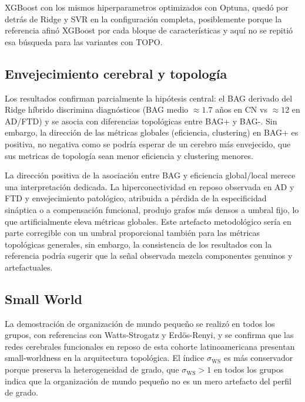 \documentclass[12pt,a4paper]{article}
\begin{document}
XGBoost con los mismos hiperparametros optimizados con Optuna, quedó por detrás de Ridge y SVR en la configuración completa, posiblemente porque la referencia\cite{bazan2026} afinó XGBoost por cada bloque de características y aquí no se repitió esa búsqueda para las variantes con TOPO.

\subsection{Envejecimiento cerebral y topología}

Los resultados confirman parcialmente la hipótesis central: el BAG derivado del Ridge híbrido discrimina diagnósticos (BAG medio $\approx 1.7$ años en CN vs $\approx 12$ en AD/FTD\cite{moguilner2024}) y se asocia con diferencias topológicas entre BAG+ y BAG-. Sin embargo, la dirección de las métricas globales (eficiencia, clustering) en BAG+ es positiva, no negativa como se podría esperar de un cerebro más envejecido, que sus metricas de topología sean menor eficiencia y clustering menores.

La dirección positiva de la asociación entre BAG y eficiencia global/local merece una interpretación dedicada. La hiperconectividad en reposo observada en AD y FTD y envejecimiento patológico\cite{coronel2025}, atribuida a pérdida de la especificidad sináptica o a compensación funcional, produjo grafos más densos a umbral fijo, lo que artificialmente eleva métricas globales. Este artefacto metodológico sería en parte corregible con un umbral proporcional también para las métricas topológicas generales, sin
embargo, la consistencia de los resultados con la referencia podría sugerir que la señal observada mezcla componentes genuinos y artefactuales.


\subsection{Small World}

La demostración de organización de mundo pequeño\cite{watts1998} se realizó en todos los grupos, con referencias con Watts-Strogatz y Erdös-Renyi, y se confirma que las redes cerebrales funcionales en reposo de esta cohorte latinoamericana presentan small-worldness en la arquitectura topológica. El índice $\sigma_{\text{WS}}$ es más conservador porque preserva la heterogeneidad de grado, que $\sigma_{\text{WS}} > 1$ en todos los grupos indica que la organización de mundo pequeño no es un mero artefacto del perfil de grado.
\end{document}
